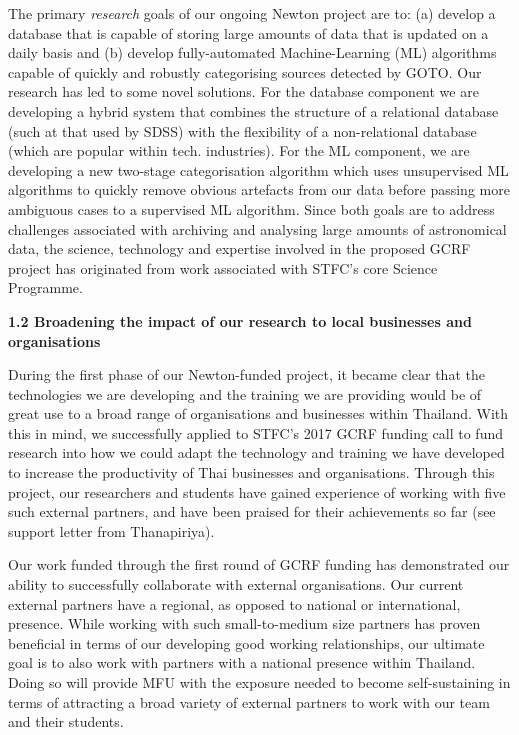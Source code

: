 \documentclass[11pt]{article}
\begin{document}
  The primary {\it research} goals of our ongoing Newton project are to: (a) develop a database that is capable of storing large amounts of data that is updated on a daily basis and (b) develop fully-automated Machine-Learning (ML) algorithms capable of quickly and robustly categorising sources detected by GOTO. Our research has led to some novel solutions. For the database component we are developing a hybrid system that combines the structure of a relational database (such at that used by SDSS) with the flexibility of a non-relational database (which are popular within tech. industries). For the ML component, we are developing a new two-stage categorisation algorithm which uses unsupervised ML algorithms to quickly remove obvious artefacts from our data before passing more ambiguous cases to a supervised ML algorithm. Since both goals are to address challenges associated with archiving and analysing large amounts of astronomical data, the science, technology and expertise involved in the proposed GCRF project has originated from work associated with STFC's core Science Programme. 
  
  \vspace{3mm}
  \noindent
  {\large \bf 1.2 Broadening the impact of our research to local businesses and organisations}
  
  \noindent
  During the first phase of our Newton-funded project, it became clear that the technologies we are developing and the training we are providing would be of great use to a broad range of organisations and businesses within Thailand. With this in mind, we successfully applied to STFC's 2017 GCRF funding call to fund research into how we could adapt the technology and training we have developed to increase the productivity of Thai businesses and organisations. Through this project, our researchers and students have gained experience of working with five such external partners, and have been praised for their achievements so far (see support letter from Thanapiriya).
  
  \vspace{2mm}
  \noindent
  Our work funded through the first round of GCRF funding has demonstrated our ability to successfully collaborate with external organisations. Our current external partners have a regional, as opposed to national or international, presence. While working with such small-to-medium size partners has proven beneficial in terms of our developing good working relationships, our ultimate goal is to also work with partners with a national presence within Thailand. Doing so will provide MFU with the exposure needed to become self-sustaining in terms of attracting a broad variety of external partners to work with our team and their students.
\end{document}
